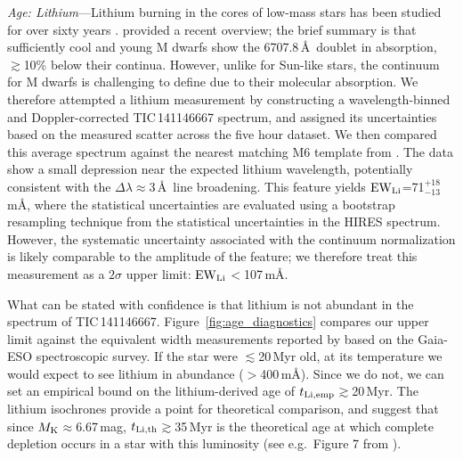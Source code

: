 \documentclass[11pt,twocolumn,tighten,linenumbers]{aastex7}
\begin{document}
{\it Age: Lithium}---Lithium burning in the cores of low-mass stars
has been studied for over sixty years
\citep[e.g.][]{Hayashi1963,Bildsten1997}.  \citet{Wood2023} provided a
recent overview; the brief summary is that sufficiently cool and
young M dwarfs show the 6707.8\,\AA\ doublet in absorption,
$\gtrsim$10\% below their continua.  However, unlike for Sun-like
stars, the continuum for M dwarfs is challenging to define due to
their molecular absorption.  We therefore attempted a lithium
measurement by constructing a wavelength-binned and Doppler-corrected
TIC\,141146667 spectrum, and assigned its uncertainties based on the
measured scatter across the five hour dataset.  We then compared this
average spectrum against the nearest matching M6 template from
\citet{Bochanski2007}.  The data show a small depression near the
expected lithium wavelength, potentially consistent with the $\Delta
\lambda$$\approx$3\,\AA\ line broadening.  This feature 
yields ${\rm EW}_{\rm Li}$=71$^{+18}_{-13}$\,m\AA, where the
statistical uncertainties are evaluated using a bootstrap resampling
technique from the statistical uncertainties in the HIRES spectrum.
However, the systematic uncertainty associated with the continuum
normalization is likely comparable to the amplitude of the feature;
we therefore treat this measurement as a $2\sigma$ upper
limit: ${\rm EW}_{\rm Li}$$<$107\,m\AA.


What can be stated with confidence is that lithium is not abundant in
the spectrum of TIC\,141146667.  Figure~\ref{fig:age_diagnostics}
compares our upper limit against the equivalent width measurements
reported by \citet{Jeffries2023} based on the Gaia-ESO spectroscopic
survey.  If the star were $\lesssim$20\,Myr old, at its temperature we
would expect to see lithium in abundance ($>$400\,m\AA).  Since we do
not, we can set an empirical bound on the lithium-derived age of
$t_{\rm Li,emp}$$\gtrsim$20\,Myr.  The \citet{Feiden2016} lithium
isochrones provide a point for theoretical comparison, and suggest
that since $M_{\rm K}$$\approx$6.67\,mag, $t_{\rm
Li,th}$$\gtrsim$35\,Myr is the theoretical age at which complete
depletion occurs in a star with this luminosity (see e.g.~Figure 7
from \citealt{Wood2023}).
\end{document}
